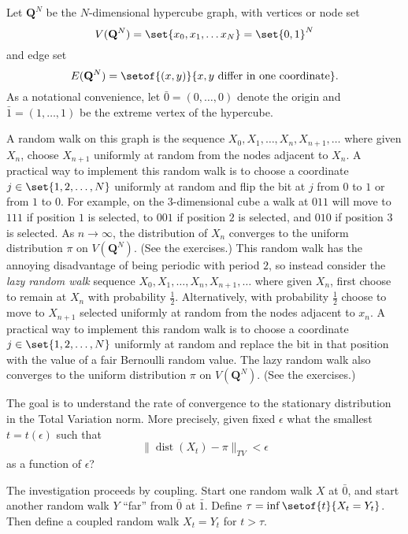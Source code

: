 \documentclass[12pt]{article}
\begin{document}
Let \( \mathbf{Q}^N \) be the \( N \)-dimensional hypercube graph, with
vertices or node set
\[
    V(\mathbf{Q}^N) = \set{x_0, x_1, \dots x_N} = \set{0,1}^N
\] and edge set
\[
    E(\mathbf{Q}^N) = \setof{(x,y)}{x, y \text{ differ in one coordinate}}.
\]%
As a notational convenience, let \( \bar{0} = (0, \dots, 0) \) denote
the origin and \( \bar{1} = (1, \dots, 1) \) be the extreme vertex of
the hypercube.

A random walk on this graph is the sequence \( X_0, X_1, \dots, X_n, X_{n+1},
\dots \) where given \( X_n \), choose \( X_{n+1} \) uniformly at random
from the nodes adjacent to \( X_n \).%
A practical way to implement this random walk is to choose a coordinate \(
j \in \set{1,2, \dots, N} \) uniformly at random and flip the bit at \(
j \) from \( 0 \) to \( 1 \) or from \( 1 \) to \( 0 \).  For example,
on the \( 3 \)-dimensional cube a walk at \( 011 \) will move to \( 111 \)
if position \( 1 \) is selected, to \( 001 \) if position \( 2 \) is
selected, and \( 010 \) if position \( 3 \) is selected.  As \( n \to
\infty \), the distribution of \( X_n \) converges to the uniform
distribution \( \pi \) on \( V(\mathbf{Q}^N) \).  (See the exercises.)
This random walk has the annoying disadvantage of being periodic with
period \( 2 \), so instead consider the \emph{lazy random walk}%
sequence \( X_0, X_1, \dots, X_n, X_{n+1}, \dots \) where given \( X_n \),
first choose to remain at \( X_n \) with probability \( \frac{1} {2} \).
Alternatively, with probability \( \frac{1}{2} \) choose to move to \( X_
{n+1} \) selected uniformly at random from the nodes adjacent to \( x_n \).
A practical way to implement this random walk is to choose a coordinate \(
j \in \set{1,2, \dots, N} \) uniformly at random and replace the bit in
that position with the value of a fair Bernoulli random value.  The lazy
random walk also converges to the uniform distribution \( \pi \) on \( V
(\mathbf{Q}^N) \).  (See the exercises.)

The goal is to understand the rate of convergence to the stationary
distribution in the Total Variation norm.  More precisely, given fixed \(
\epsilon \) what the smallest \( t = t(\epsilon) \) such that
\[
    \|
    \operatorname{dist}
    (X_t) - \pi \|_{TV} < \epsilon
\] as a function of \( \epsilon \)?

The investigation proceeds by coupling.%
Start one random walk \( X \) at \( \bar{0} \), and start another random
walk \( Y \) ``far'' from \( \bar{0} \) at \( \bar{1} \).  Define \(
\tau = \inf \setof{t} {X_t = Y_t} \).  Then define a coupled random walk
\( X_t = Y_t \) for \( t > \tau \).
\end{document}

